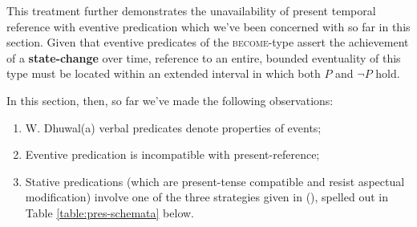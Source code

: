 This treatment further demonstrates the unavailability of present temporal reference with eventive predication which we've been concerned with so far in this section. Given that eventive predicates of the \textsc{become}-type assert the achievement of a \textbf{state-change} over time, reference to an entire, bounded eventuality of this type must be located within an extended interval in which both $ P $ and $ \neg P $ hold.

\noindent In this section, then, so far we've made the following observations:
\begin{enumerate}[\bf\sf i.]
	\item W. Dhuwal(a) verbal predicates denote properties of events;
	\item Eventive predication is incompatible with present-reference;
	\item Stative predications (which are present-tense compatible and resist aspectual modification) involve one of the three strategies given in (), spelled out in Table \ref{table:pres-schemata} below. 
\end{enumerate}





